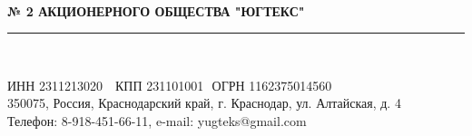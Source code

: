 \setcounter{page}{1}

\begin{center}
	\Large\textbf{
		\\[-1.5mm]
		№ 2 АКЦИОНЕРНОГО ОБЩЕСТВА "ЮГТЕКС"\\[-7mm]}
	\noindent\rule{\textwidth-10mm}{1pt}\\[-10mm]  %
\end{center}
\vspace{-6mm}
\begin{center}
		{\small{ИНН 2311213020 \,\, КПП 231101001\,\,
			ОГРН 1162375014560\\[-2mm]350075}{, Россия, Краснодарский край, г. Краснодар, ул. Алтайская, д. 4 \\[-2mm]
			Телефон:  8-918-451-66-11, e-mail: yugteks@gmail.com}}
	\\[4mm]
\end{center}


%

